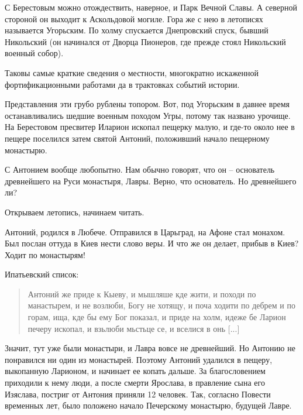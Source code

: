 С Берестовым можно отождествить, наверное, и Парк Вечной Славы. А северной стороной он выходит к Аскольдовой могиле. Гора же с нею в летописях называется Угорьским. По холму спускается Днепровский спуск, бывший Никольский (он начинался от Дворца Пионеров, где прежде стоял Никольский военный собор).

Таковы самые краткие сведения о местности, многократно искаженной фортификационными работами да в трактовках событий истории.

Представления эти грубо рублены топором. Вот, под Угорьским в давнее время останавливались шедшие военным походом Угры, потому так названо урочище. На Берестовом пресвитер Иларион ископал пещерку малую, и где-то около нее в пещере поселился затем святой Антоний, положивший начало пещерному монастырю. 

С Антонием вообще любопытно. Нам обычно говорят, что он – основатель древнейшего на Руси монастыря, Лавры. Верно, что основатель. Но древнейшего ли? 

Открываем летопись, начинаем читать.

Антоний, родился в Любече. Отправился в Царьград, на Афоне стал монахом. Был послан оттуда в Киев нести слово веры. И что же он делает, прибыв в Киев? Ходит по монастырям!

Ипатьевский список:

\begin{quotation}
Антоний же приде к Кыеву, и мышляше кде жити, и походи по манастырем, и не возлюби, Богу не хотящу, и поча ходити по дебрем и по горам, ища, кде бы ему Бог показал, и приде на холм, идеже бе Ларион печеру ископал, и взьлюби мьстьце се, и вселися в онь [...]
\end{quotation}

Значит, тут уже были монастыри, и Лавра вовсе не древнейший. Но Антонию не понравился ни один из монастырей. Поэтому Антоний удалился в пещеру, выкопанную Ларионом, и начинает ее копать дальше. За благословением приходили к нему люди, а после смерти Ярослава, в правление сына его Изяслава, постриг от Антония приняли 12 человек. Так, согласно Повести временных лет, было положено начало Печерскому монастырю, будущей Лавре.

